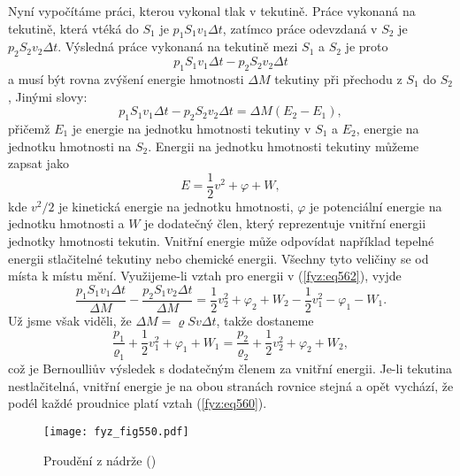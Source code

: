 {    Nyní vypočítáme práci, kterou vykonal tlak v tekutině. Práce vykonaná na tekutině, která vtéká 
    do \(S_1\) je \(p_1S_1v_1\Delta t\), zatímco práce odevzdaná v \(S_2\) je \(p_2S_2v_2\Delta 
    t\). Výsledná práce vykonaná na tekutině mezi \(S_1\) a \(S_2\) je proto
    \begin{equation*}
      p_1S_1v_1\Delta t - p_2S_2v_2\Delta t
    \end{equation*}
    a musí být rovna zvýšení energie hmotnosti \(\Delta M\) tekutiny při přechodu z \(S_1\) do 
    \(S_2\), Jinými slovy:
    \begin{equation}\label{fyz:eq562}
      p_1S_1v_1\Delta t - p_2S_2v_2\Delta t = \Delta M(E_2 - E_1),
    \end{equation}
    přičemž \(E_1\) je energie na jednotku hmotnosti tekutiny v \(S_1\) a \(E_2\), energie na 
    jednotku hmotnosti na \(S_2\). Energii na jednotku hmotnosti tekutiny můžeme zapsat jako
    \begin{equation*}
      E = \dfrac{1}{2}v^2 + \varphi + W,
    \end{equation*}
    kde \(v^2/2\) je kinetická energie na jednotku hmotnosti, \(\varphi\) je potenciální energie na 
    jednotku hmotnosti a \(W\) je dodatečný člen, který reprezentuje vnitřní energii jednotky 
    hmotnosti tekutin. Vnitřní energie může odpovídat například tepelné energii stlačitelné 
    tekutiny nebo chemické energii. Všechny tyto veličiny se od místa k místu mění. Využijeme-li 
    vztah pro energii v (\ref{fyz:eq562}), vyjde
    \begin{equation*}
      \dfrac{p_1S_1v_1\Delta t}{\Delta M} - \dfrac{p_2S_1v_2\Delta t}{\Delta M} = 
        \dfrac{1}{2}v_2^2 + \varphi_2 + W_2 - \dfrac{1}{2}v_1^2 - \varphi_1 - W_1.
    \end{equation*}
    Už jsme však viděli, že \(\Delta M= \varrho Sv\Delta t\), takže dostaneme
    \begin{equation}\label{fyz:eq563}
      \dfrac{p_1}{\varrho_1} + \dfrac{1}{2}v_1^2 + \varphi_1 + W_1 
        = \dfrac{p_2}{\varrho_2} + \dfrac{1}{2}v_2^2 + \varphi_2 + W_2,
    \end{equation}
    což je Bernoulliův výsledek s dodatečným členem za vnitřní energii. Je-li tekutina 
    nestlačitelná, vnitřní energie je na obou stranách rovnice stejná a opět vychází, že podél 
    každé proudnice platí vztah (\ref{fyz:eq560}).
    
    \begin{figure}[ht!] %
      \centering
      \texttt{[image: fyz\_fig550.pdf]}
      \caption{Proudění z nádrže
               (\cite[s.~749]{Feynman02})}
      \label{fyz_fig550}
    \end{figure}

}
